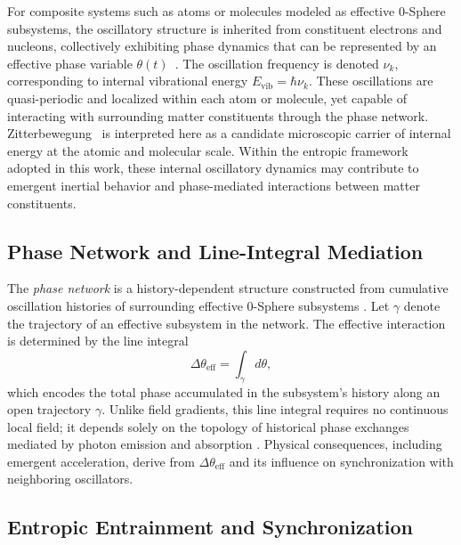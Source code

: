 \documentclass[%
 reprint,
 amsmath,amssymb,
 aps,
 prb,
]{revtex4-2}
\numberwithin{equation}{section}
\begin{document}
For composite systems such as atoms or molecules modeled as effective 0-Sphere subsystems, the oscillatory structure is inherited from constituent electrons and nucleons, collectively exhibiting phase dynamics that can be represented by an effective phase variable $\theta(t)$~\cite{Hanamura2026Trilogy3,Hanamura2025Trilogy1}. The oscillation frequency is denoted $\nu_k$, corresponding to internal vibrational energy $E_\text{vib} = \hbar \nu_k$. These oscillations are quasi-periodic and localized within each atom or molecule, yet capable of interacting with surrounding matter constituents through the phase network. Zitterbewegung~\cite{Schrodinger1930,Dirac1928,Barut1981} is interpreted here as a candidate microscopic carrier of internal energy at the atomic and molecular scale. Within the entropic framework adopted in this work, these internal oscillatory dynamics may contribute to emergent inertial behavior and phase-mediated interactions between matter constituents.

\subsection{Phase Network and Line-Integral Mediation}

The \textit{phase network} is a history-dependent structure constructed from cumulative oscillation histories of surrounding effective 0-Sphere subsystems \cite{Hanamura2026Trilogy3}. Let $\gamma$ denote the trajectory of an effective subsystem in the network. The effective interaction is determined by the line integral
\begin{equation}
\Delta \theta_\text{eff} = \int_\gamma d\theta,
\label{eq:line_integral}
\end{equation}
which encodes the total phase accumulated in the subsystem's history along an open trajectory $\gamma$. Unlike field gradients, this line integral requires no continuous local field; it depends solely on the topology of historical phase exchanges mediated by photon emission and absorption \cite{AharonovBohm1959,Berry1984,WilsonLoop1974}. Physical consequences, including emergent acceleration, derive from $\Delta \theta_\text{eff}$ and its influence on synchronization with neighboring oscillators.

\subsection{Entropic Entrainment and Synchronization}
\end{document}
